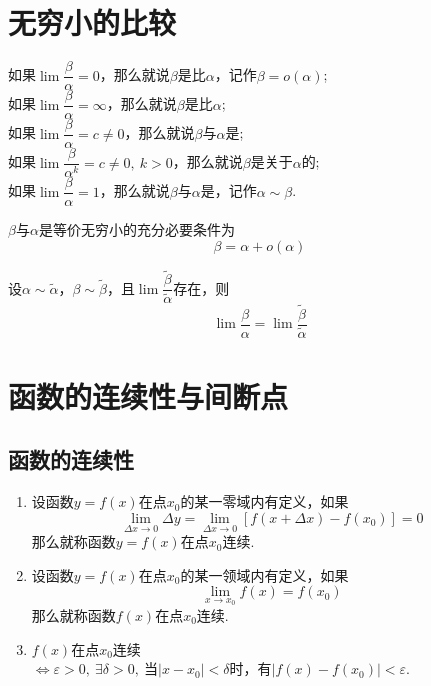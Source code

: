\documentclass[lang=cn,10pt]{elegantbook}
\begin{document}
\section{无穷小的比较}
\begin{definition}
	如果\( \lim \dfrac{\beta}{\alpha} = 0 \)，那么就说\( \beta \)是比\( \alpha \)，记作\( \beta = o(\alpha) \);\\
	如果\( \lim \dfrac{\beta}{\alpha} = \infty \)，那么就说\( \beta \)是比\( \alpha \);\\
	如果\( \lim \dfrac{\beta}{\alpha} = c \neq 0 \)，那么就说\( \beta \)与\( \alpha \)是;\\
	如果\( \lim \dfrac{\beta}{\alpha^{k}} = c \neq 0,\ k > 0 \)，那么就说\( \beta \)是关于\( \alpha \)的;\\
	如果\( \lim \dfrac{\beta}{\alpha} = 1 \)，那么就说\( \beta \)与\( \alpha \)是，记作\( \alpha \sim \beta \).
\end{definition}

\begin{theorem}
	\( \beta \)与\( \alpha \)是等价无穷小的{\heiti 充分必要条件}为
	\[ \beta = \alpha + o(\alpha) \]
\end{theorem}

\begin{theorem}
	设\( \alpha \sim \widetilde{\alpha} \)，\( \beta \sim \widetilde{\beta} \)，且\( \lim \dfrac{\widetilde{\beta}}{\widetilde{\alpha}} \)存在，则
	\[ \lim\dfrac{\beta}{\alpha} = \lim\dfrac{\widetilde{\beta}}{\widetilde{\alpha}} \]
\end{theorem}

\section{函数的连续性与间断点}

\subsection{函数的连续性}
\begin{definition}
	\begin{enumerate}
		\item 设函数\( y = f(x) \)在点\( x_{0} \)的某一零域内有定义，如果
		\[ \lim\limits_{\Delta x \to 0}\Delta y = \lim\limits_{\Delta x \to 0}[f(x + \Delta x) - f(x_{0})] = 0 \]
		那么就称函数\( y = f(x) \)在点\( x_{0} \)连续.
		\item 设函数\( y = f(x) \)在点\( x_{0} \)的某一领域内有定义，如果
		\[ \lim\limits_{x \to x_{0}}f(x) = f(x_{0}) \]
		那么就称函数\( f(x) \)在点\( x_{0} \)连续.
		\item \( f(x) \)在点\( x_{0} \)连续\( \Leftrightarrow \varepsilon > 0,\ \exists \delta > 0,\ \text{当}| x - x_{0}|< \delta \text{时，有}|f(x) - f(x_{0})| < \varepsilon \).
	\end{enumerate}
\end{definition}
\end{document}
